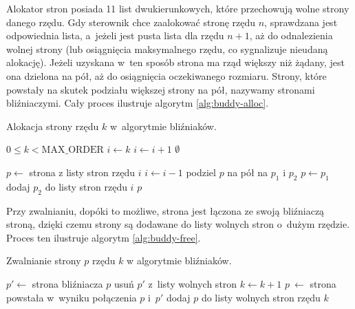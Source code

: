 Alokator stron posiada 11 list dwukierunkowych, które przechowują
wolne strony danego rzędu.  Gdy sterownik chce zaalokować stronę rzędu
$n$, sprawdzana jest odpowiednia lista, a~jeżeli jest pusta lista dla
rzędu $n+1$, aż do odnalezienia wolnej strony (lub osiągnięcia
maksymalnego rzędu, co sygnalizuje nieudaną alokację).  Jeżeli
uzyskana w~ten sposób strona ma rząd większy niż żądany, jest ona
dzielona na pół, aż do osiągnięcia oczekiwanego rozmiaru.  Strony,
które powstały na skutek podziału większej strony na pół, nazywamy
stronami bliźniaczymi.  Cały proces ilustruje algorytm
\ref{alg:buddy-alloc}.

\begin{algorithm}[p]
\caption[Alokacja strony w~algorytmie bliźniaków.]{Alokacja strony
  rzędu $k$ w~algorytmie bliźniaków.}
\label{alg:buddy-alloc}
\begin{algorithmic}[1]
\Require $0 \leq k < \mathrm{MAX\_ORDER}$
    \State $i \gets k$
        \State $i \gets i + 1$
            \State \Return $\emptyset$
        \EndIf
    \EndWhile

    \State $p \gets$ strona z listy stron rzędu $i$
        \State $i \gets i - 1$
        \State podziel $p$ na pół na $p_1$ i $p_2$
        \State $p \gets p_1$
        \State dodaj $p_2$ do listy stron rzędu $i$
    \EndWhile
    \State \Return $p$
\EndFunction
\end{algorithmic}
\end{algorithm}

Przy zwalnianiu, dopóki to możliwe, strona jest łączona ze swoją
bliźniaczą stroną, dzięki czemu strony są dodawane do listy wolnych
stron o~dużym rzędzie.  Proces ten ilustruje algorytm
\ref{alg:buddy-free}.

\begin{algorithm}[p]
\caption[Zwalnianie strony w~algorytmie bliźniaków.]{Zwalnianie strony
  $p$ rzędu $k$ w algorytmie bliźniaków.}
\label{alg:buddy-free}
\begin{algorithmic}[1]
        \State $p' \gets$ strona bliźniacza $p$
        \State usuń $p'$ z~listy wolnych stron
        \State $k \gets k + 1$
        \State $p~\gets$ strona powstała w~wyniku połączenia $p$ i~$p'$ \label{alg:buddy-free:join}
    \EndWhile
    \State dodaj $p$ do listy wolnych stron rzędu $k$ \label{alg:buddy-free:add}
\EndProcedure
\end{algorithmic}
\end{algorithm}

